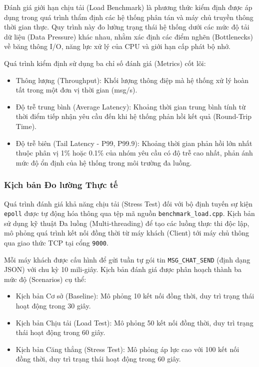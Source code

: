 Đánh giá giới hạn chịu tải (Load Benchmark) là phương thức kiểm định được áp dụng trong quá trình thẩm định các hệ thống phân tán và máy chủ truyền thông thời gian thực. Quy trình này đo lường trạng thái hệ thống dưới các mức độ tải dữ liệu (Data Pressure) khác nhau, nhằm xác định các điểm nghẽn (Bottlenecks) về băng thông I/O, năng lực xử lý của CPU và giới hạn cấp phát bộ nhớ.

Quá trình kiểm định sử dụng ba chỉ số đánh giá (Metrics) cốt lõi:
\begin{itemize}[label={-}]
    \item Thông lượng (Throughput): Khối lượng thông điệp mà hệ thống xử lý hoàn tất trong một đơn vị thời gian (msg/s).
    \item Độ trễ trung bình (Average Latency): Khoảng thời gian trung bình tính từ thời điểm tiếp nhận yêu cầu đến khi hệ thống phản hồi kết quả (Round-Trip Time).
    \item Độ trễ biên (Tail Latency - P99, P99.9): Khoảng thời gian phản hồi lớn nhất thuộc phân vị 1\% hoặc 0.1\% của nhóm yêu cầu có độ trễ cao nhất, phản ánh mức độ ổn định của hệ thống trong môi trường đa luồng.
\end{itemize}

\subsubsection{Kịch bản Đo lường Thực tế}

Quá trình đánh giá khả năng chịu tải (Stress Test) đối với bộ định tuyến sự kiện \texttt{epoll} được tự động hóa thông qua tệp mã nguồn \texttt{benchmark\_load.cpp}. Kịch bản sử dụng kỹ thuật Đa luồng (Multi-threading) để tạo các luồng thực thi độc lập, mô phỏng quá trình kết nối đồng thời từ máy khách (Client) tới máy chủ thông qua giao thức TCP tại cổng \texttt{9000}.

Mỗi máy khách được cấu hình để gửi tuần tự gói tin \texttt{MSG\_CHAT\_SEND} (định dạng JSON) với chu kỳ 10 mili-giây. Kịch bản đánh giá được phân hoạch thành ba mức độ (Scenarios) cụ thể:
\begin{itemize}[label={-}]
    \item Kịch bản Cơ sở (Baseline): Mô phỏng 10 kết nối đồng thời, duy trì trạng thái hoạt động trong 30 giây.
    \item Kịch bản Chịu tải (Load Test): Mô phỏng 50 kết nối đồng thời, duy trì trạng thái hoạt động trong 60 giây.
    \item Kịch bản Căng thẳng (Stress Test): Mô phỏng áp lực cao với 100 kết nối đồng thời, duy trì trạng thái hoạt động trong 60 giây.
\end{itemize}

